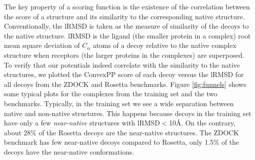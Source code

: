 The key property of a scoring function is the existence of the correlation between the score of a structure and its similarity to the corresponding native structure. 
Conventionally, the lRMSD is taken as the measure of similarity of the decoys to the native structure. 
lRMSD is the ligand (the smaller protein in a complex) root mean square deviation of $C_\alpha$ atoms of a decoy relative to the native complex structure when 
receptors (the larger proteins in the complexes) are superposed.
To verify that our potentials indeed correlate with the similarity to the native structures, we plotted the ConvexPP score of 
each decoy versus the lRMSD for all decoys from the ZDOCK and Rosetta benchmarks. 
%
Figure \ref{fig:funnels} shows some typical plots for the complexes from the training set and the two benchmarks.
%
Typically, in the training set we see a wide separation between native and non-native structures. This happens because decoys in the training set have only a 
few {\em near-native} structures with lRMSD$<$10\AA. On the contrary, about 28\% of the Rosetta decoys are the near-native structures. The 
ZDOCK benchmark has few near-native decoys compared to Rosetta, only 1.5\% of the decoys have the near-native conformations.

